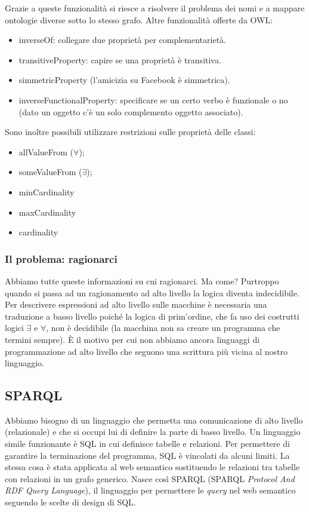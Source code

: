 				Grazie a queste funzionalità si riesce a risolvere il problema dei nomi e a mappare ontologie diverse sotto lo stesso grafo. Altre funzionalità offerte da OWL:
				
					\begin{itemize}
						\item inverseOf: collegare due proprietà per complementarietà.
						\item transitiveProperty: capire se una proprietà è transitiva.
						\item simmetricProperty (l'amicizia su Facebook è simmetrica).
						\item inverseFunctionalProperty: specificare se un certo verbo è funzionale o no (dato un oggetto c'è un solo complemento oggetto associato).
					\end{itemize}
					
				Sono inoltre possibili utilizzare restrizioni sulle proprietà delle classi:
				\begin{itemize}
					\item allValueFrom ($\forall$);
					\item someValueFrom ($\exists$);
					\item minCardinality
					\item maxCardinality
					\item cardinality
				\end{itemize}
				
			\subsubsection{Il problema: ragionarci}
				Abbiamo tutte queste informazioni su cui ragionarci. Ma come? Purtroppo quando si passa ad un ragionamento ad alto livello la logica diventa indecidibile. Per descrivere espressioni ad alto livello sulle macchine è necessaria una traduzione a basso livello poiché la logica di prim'ordine, che fa uso dei costrutti logici $\exists$ e $\forall$, non è decidibile (la macchina non sa creare un programma che termini sempre). È il motivo per cui non abbiamo ancora linguaggi di programmazione ad alto livello che seguono una scrittura più vicina al nostro linguaggio.
			
		\subsection{SPARQL}
			Abbiamo bisogno di un linguaggio che permetta una comunicazione di alto livello (relazionale) e che si occupi lui di definire la parte di basso livello. Un linguaggio simile funzionante è SQL in cui definisce tabelle e relazioni. Per permettere di garantire la terminazione del programma, SQL è vincolati da alcuni limiti. La stessa cosa è stata applicata al web semantico sostituendo le relazioni tra tabelle con relazioni in un grafo generico. Nasce così SPARQL (SPARQL \emph{Protocol And RDF Query Language}), il linguaggio per permettere le \emph{query} nel web semantico seguendo le scelte di design di SQL.
		
